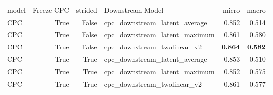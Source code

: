 \begin{adjustbox}{width=\textwidth}
\begin{tabular}{lrrlrr}
{model} & {Freeze CPC} & {strided} & {Downstream Model} & {micro} & {macro} \\
CPC & True & False & cpc\_downstream\_latent\_average & 0.852 & 0.514 \\
CPC & True & False & cpc\_downstream\_latent\_maximum & 0.861 & 0.580 \\
CPC & True & False & cpc\_downstream\_twolinear\_v2 & \bfseries \underline{0.864} & \bfseries \underline{0.582} \\
CPC & True & True & cpc\_downstream\_latent\_average & 0.853 & 0.510 \\
CPC & True & True & cpc\_downstream\_latent\_maximum & 0.852 & 0.575 \\
CPC & True & True & cpc\_downstream\_twolinear\_v2 & 0.861 & 0.577 \\
\end{tabular}
\end{adjustbox}
